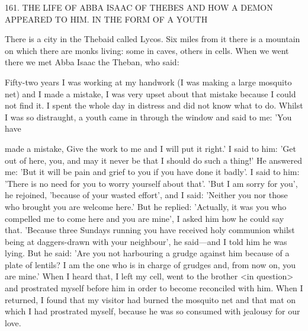 161.
THE LIFE OF ABBA ISAAC OF THEBES AND
HOW A DEMON APPEARED TO HIM.
IN THE FORM OF A YOUTH

There is a city in the Thebaid called Lycos.
Six miles from it there
is a mountain on which there are monks living: some in caves,
others in cells.
When we went there we met Abba Isaac the Theban,
who said:

Fifty-two years I was working at my handwork (I was making a
large mosquito net) and I made a mistake, I was very upset about
that mistake because I could not find it.
I spent the whole day in
distress and did not know what to do.
Whilst I was so distraught,
a youth came in through the window and said to me: 'You have

made a mistake, Give the work to me and I will put it right.' I said
to him: 'Get out of here, you, and may it never be that I should do
such a thing!' He answered me: 'But it will be pain and grief to you
if you have done it badly'.
I said to him: 'There is no need for you
to worry yourself about that'.
'But I am sorry for you', he rejoined,
'because of your wasted effort', and I said: 'Neither you nor those
who brought you are welcome here.' But he replied: 'Actually, it
was you who compelled me to come here and you are mine', I asked
him how he could say that.
'Because three Sundays running you
have received holy communion whilst being at daggers-drawn with
your neighbour', he said—and I told him he was lying.
But he said:
'Are you not harbouring a grudge against him because of a plate of
lentils? I am the one who is in charge of grudges and, from now on,
you are mine.' When I heard that, I left my cell, went to the brother
<in question> and prostrated myself before him in order to become
reconciled with him.
When I returned, I found that my visitor had
burned the mosquito net and that mat on which I had prostrated
myself, because he was so consumed with jealousy for our love.

